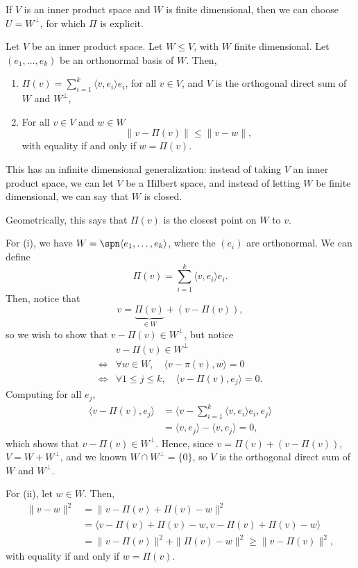 \documentclass[12pt]{article}
\begin{document}
If $V$ is an inner product space and $W$ is finite dimensional, then we can choose $U = W^{\perp}$, for which $\Pi$ is explicit.

\begin{lemma}
	Let $V$ be an inner product space. Let $W \leq V$, with $W$ finite dimensional. Let $(e_1, \ldots, e_k)$ be an orthonormal basis of $W$. Then,
	\begin{enumerate}[\normalfont(i)]
		\item $\Pi(v) = \sum_{i = 1}^{k} \langle v, e_i \rangle e_i$, for all $v \in V$, and $V$ is the orthogonal direct sum of $W$ and $W^{\perp}$,
		\item  For all $v \in V$ and $w \in W$ 
			\[
			\|v - \Pi(v)\| \leq \|v - w\|
			,\]
			with equality if and only if $w = \Pi(v)$.
	\end{enumerate}
\end{lemma}

\begin{remark}
	This has an infinite dimensional generalization: instead of taking $V$ an inner product space, we can let $V$ be a Hilbert space, and instead of letting $W$ be finite dimensional, we can say that $W$ is closed.

	Geometrically, this says that $\Pi(v)$ is the closest point on $W$ to $v$.
\end{remark}

\begin{proofbox}
	For (i), we have $W = \spn \langle e_1, \ldots, e_k \rangle$, where the $(e_i)$ are orthonormal. We can define
	\[
	\Pi(v) = \sum_{i = 1}^{k}\langle v, e_i \rangle e_i
	.\]
	Then, notice that
	\[
		v = \underbrace{\Pi(v)}_{\in W} + (v -  \Pi(v))
	,\]
	so we wish to show that $v - \Pi(v) \in W^{\perp}$, but notice
	\begin{align*}
		& v - \Pi(v) \in W^{\perp} \\
		\iff & \forall w \in W, \quad \langle v - \pi(v), w \rangle = 0 \\
		\iff & \forall 1 \leq j \leq k, \quad \langle v - \Pi(v), e_j \rangle = 0.
	\end{align*}
	Computing for all $e_j$,
	\begin{align*}
		\langle v - \Pi(v), e_j \rangle &= \biggl \langle v - \sum_{i = 1}^{k} \langle v, e_i \rangle e_i, e_j \biggr\rangle \\
						&= \langle v, e_j \rangle - \langle v, e_j \rangle = 0,
	\end{align*}
	which shows that $v - \Pi(v) \in W^{\perp}$. Hence, since $v = \Pi(v) + (v - \Pi(v))$, $V = W + W^{\perp}$, and we known $W \cap W^{\perp} = \{0\}$, so $V$ is the orthogonal direct sum of $W$ and $W^{\perp}$.

	For (ii), let $w \in W$. Then,
	\begin{align*}
		\|v - w\|^2 &= \|v - \Pi(v) + \Pi(v) - w\|^2 \\
			    &= \langle v - \Pi(v) + \Pi(v) - w, v - \Pi(v) + \Pi(v) - w \rangle \\
			    &= \|v - \Pi(v)\|^2 + \|\Pi(v) - w\|^2 \geq \|v - \Pi(v)\|^2,
	\end{align*}
	with equality if and only if $w = \Pi(v)$.
\end{proofbox}
\end{document}
